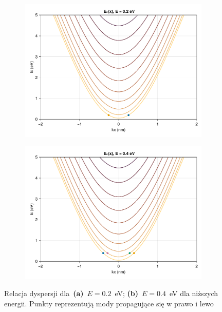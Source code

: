\documentclass{article}
\begin{document}
\begin{figure}[htp!]
    \centering
\begin{subfigure}{.495\textwidth}
\centering
\includegraphics[width=1.0\textwidth]{ex2_disperssion_energy02.pdf}
    \caption{}
    \label{fig:ex1e02}
\end{subfigure}
\begin{subfigure}{.495\textwidth}
\centering
\includegraphics[width=1.0\textwidth]{ex2_disperssion_energy04.pdf}
    \caption{}
    \label{fig:ex1e04}
\end{subfigure}
\caption{Relacja dyspersji dla~\textbf{(a)}~$E = 0.2$~eV; \textbf{(b)}~$E =  0.4$~eV dla niższych energii.
Punkty reprezentują mody propagujące się w prawo i lewo}
\label{ex2_disp_rel_0204}
\end{figure}
\end{document}
